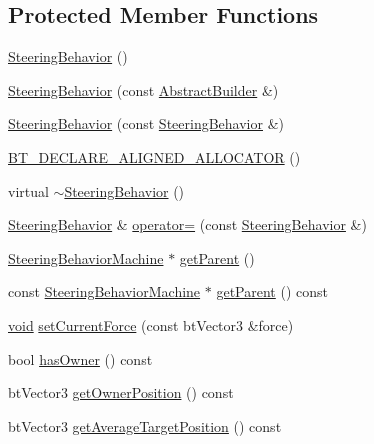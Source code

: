 \subsection*{Protected Member Functions}
\begin{DoxyCompactItemize}
\item 
\mbox{\hyperlink{classnjli_1_1_steering_behavior_a643a4f5e0c276d94fb5e7d130b0ef446}{Steering\+Behavior}} ()
\item 
\mbox{\hyperlink{classnjli_1_1_steering_behavior_a702de6537bd43b15bd2e4c41a6ad3552}{Steering\+Behavior}} (const \mbox{\hyperlink{classnjli_1_1_abstract_builder}{Abstract\+Builder}} \&)
\item 
\mbox{\hyperlink{classnjli_1_1_steering_behavior_a52a459d7e95c05ad3dc04f7bc08bb99c}{Steering\+Behavior}} (const \mbox{\hyperlink{classnjli_1_1_steering_behavior}{Steering\+Behavior}} \&)
\item 
\mbox{\hyperlink{classnjli_1_1_steering_behavior_adae316d4515e5cd6c4219d09717e2cc9}{B\+T\+\_\+\+D\+E\+C\+L\+A\+R\+E\+\_\+\+A\+L\+I\+G\+N\+E\+D\+\_\+\+A\+L\+L\+O\+C\+A\+T\+OR}} ()
\item 
virtual \mbox{\hyperlink{classnjli_1_1_steering_behavior_adf0866d38fe7dd3aaf8048b80911a93d}{$\sim$\+Steering\+Behavior}} ()
\item 
\mbox{\hyperlink{classnjli_1_1_steering_behavior}{Steering\+Behavior}} \& \mbox{\hyperlink{classnjli_1_1_steering_behavior_a4b99b614e4f9ed862949fe0bbe4a374b}{operator=}} (const \mbox{\hyperlink{classnjli_1_1_steering_behavior}{Steering\+Behavior}} \&)
\item 
\mbox{\hyperlink{classnjli_1_1_steering_behavior_machine}{Steering\+Behavior\+Machine}} $\ast$ \mbox{\hyperlink{classnjli_1_1_steering_behavior_aac8d25429493fe07310052e7c0b07dda}{get\+Parent}} ()
\item 
const \mbox{\hyperlink{classnjli_1_1_steering_behavior_machine}{Steering\+Behavior\+Machine}} $\ast$ \mbox{\hyperlink{classnjli_1_1_steering_behavior_ad9fc58487698c22d3b07c864863044d8}{get\+Parent}} () const
\item 
\mbox{\hyperlink{_thread_8h_af1e856da2e658414cb2456cb6f7ebc66}{void}} \mbox{\hyperlink{classnjli_1_1_steering_behavior_ad99f0f1056a0a980456e107bb3305fab}{set\+Current\+Force}} (const bt\+Vector3 \&force)
\item 
bool \mbox{\hyperlink{classnjli_1_1_steering_behavior_ac31b1718aa4edc52cb1598671c2ce9ba}{has\+Owner}} () const
\item 
bt\+Vector3 \mbox{\hyperlink{classnjli_1_1_steering_behavior_ae271bdd9879d6160e187c53ac9548099}{get\+Owner\+Position}} () const
\item 
bt\+Vector3 \mbox{\hyperlink{classnjli_1_1_steering_behavior_a7db08fdeb6eb0f065262f5ee0b1e26d1}{get\+Average\+Target\+Position}} () const
\end{DoxyCompactItemize}
